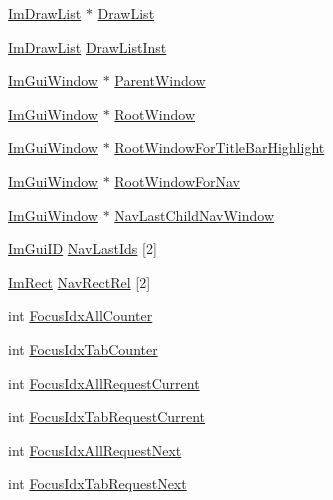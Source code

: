 \begin{DoxyCompactItemize}
\item 
\mbox{\hyperlink{struct_im_draw_list}{Im\+Draw\+List}} $\ast$ \mbox{\hyperlink{struct_im_gui_window_a39de4668b09754136c6fd7ab89ab674a}{Draw\+List}}
\item 
\mbox{\hyperlink{struct_im_draw_list}{Im\+Draw\+List}} \mbox{\hyperlink{struct_im_gui_window_aa99947e76fbf897c02ce1de44c202031}{Draw\+List\+Inst}}
\item 
\mbox{\hyperlink{struct_im_gui_window}{Im\+Gui\+Window}} $\ast$ \mbox{\hyperlink{struct_im_gui_window_a5f0b37cb12fbeb3efe00d0cd826d5d65}{Parent\+Window}}
\item 
\mbox{\hyperlink{struct_im_gui_window}{Im\+Gui\+Window}} $\ast$ \mbox{\hyperlink{struct_im_gui_window_aef9281297b0993c8f1b7c1ff7987cb61}{Root\+Window}}
\item 
\mbox{\hyperlink{struct_im_gui_window}{Im\+Gui\+Window}} $\ast$ \mbox{\hyperlink{struct_im_gui_window_ae5d5c6637b63f35edc415162a5674c1e}{Root\+Window\+For\+Title\+Bar\+Highlight}}
\item 
\mbox{\hyperlink{struct_im_gui_window}{Im\+Gui\+Window}} $\ast$ \mbox{\hyperlink{struct_im_gui_window_a949a4aa260a21e8a8d2f65ffbe789712}{Root\+Window\+For\+Nav}}
\item 
\mbox{\hyperlink{struct_im_gui_window}{Im\+Gui\+Window}} $\ast$ \mbox{\hyperlink{struct_im_gui_window_a7255735a59782a09b4536e633e5153dd}{Nav\+Last\+Child\+Nav\+Window}}
\item 
\mbox{\hyperlink{imgui_8h_a1785c9b6f4e16406764a85f32582236f}{Im\+Gui\+ID}} \mbox{\hyperlink{struct_im_gui_window_af5ca9ef94d021549cbd27f0a4c0a103b}{Nav\+Last\+Ids}} \mbox{[}2\mbox{]}
\item 
\mbox{\hyperlink{struct_im_rect}{Im\+Rect}} \mbox{\hyperlink{struct_im_gui_window_a543b098357825e2a415d5f9f3a39adb5}{Nav\+Rect\+Rel}} \mbox{[}2\mbox{]}
\item 
int \mbox{\hyperlink{struct_im_gui_window_a51ee526aed5b993e0a849f2db1fdc4dc}{Focus\+Idx\+All\+Counter}}
\item 
int \mbox{\hyperlink{struct_im_gui_window_a7e3e75ec3d66d04801bfffdd02643d3c}{Focus\+Idx\+Tab\+Counter}}
\item 
int \mbox{\hyperlink{struct_im_gui_window_adfbeeeaa2eebd054ec0cd99dccb34f2f}{Focus\+Idx\+All\+Request\+Current}}
\item 
int \mbox{\hyperlink{struct_im_gui_window_a71c9ea6561a07160e5ce552db1d64b0b}{Focus\+Idx\+Tab\+Request\+Current}}
\item 
int \mbox{\hyperlink{struct_im_gui_window_a152487f402088ce413bb6c215b308c34}{Focus\+Idx\+All\+Request\+Next}}
\item 
int \mbox{\hyperlink{struct_im_gui_window_af7e93a1027da314fe73b64d97bfa73be}{Focus\+Idx\+Tab\+Request\+Next}}
\end{DoxyCompactItemize}


